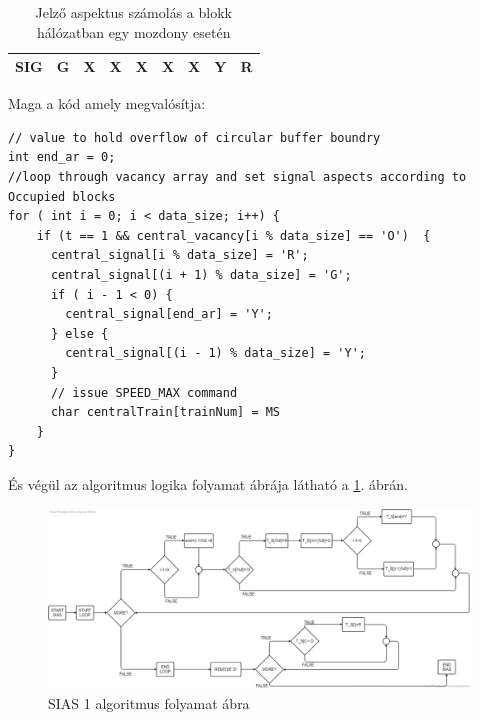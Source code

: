 \documentclass[a4paper,12pt]{article}
\begin{document}
\begin{table}[htp]
\begin{tabular}{lllllllll}
\multicolumn{1}{|l|}{SIG}   & \multicolumn{1}{l|}{\cellcolor[HTML]{009901}G} & \multicolumn{1}{l|}{X}                         & \multicolumn{1}{l|}{X}                         & \multicolumn{1}{l|}{X}                         & \multicolumn{1}{l|}{X}                         & \multicolumn{1}{l|}{X}                         & \multicolumn{1}{l|}{\cellcolor[HTML]{F8FF00}Y}                        & \multicolumn{1}{l|}{\cellcolor[HTML]{FE0000}R}                        \\ \hline
\end{tabular}
\caption[SIAS 1 mozdonnyal]{Jelző aspektus számolás a blokk hálózatban egy mozdony esetén}
\label{tab:sias_onetrain}
\end{table}

Maga a kód amely megvalósítja:

\begin{minipage}{\linewidth}
\begin{lstlisting}[style=CStyle, caption={SIAS algoritmus, egy vonat esettén az ACC-ben},label=code:acc_sias_1]
// value to hold overflow of circular buffer boundry
int end_ar = 0;
//loop through vacancy array and set signal aspects according to Occupied blocks
for ( int i = 0; i < data_size; i++) {
	if (t == 1 && central_vacancy[i % data_size] == 'O')  {
      central_signal[i % data_size] = 'R';
      central_signal[(i + 1) % data_size] = 'G';
      if ( i - 1 < 0) {
        central_signal[end_ar] = 'Y';
      } else {
        central_signal[(i - 1) % data_size] = 'Y';
      }
      // issue SPEED_MAX command
	  char centralTrain[trainNum] = MS
    }
}
\end{lstlisting}
\end{minipage}
És végül az algoritmus logika folyamat ábrája látható a \ref{fig:SIAS1flowchart}. ábrán.

\begin{figure}[!htp]
	\includegraphics[width=\linewidth]{images/SIAS1_module_flow_chart.png}
    \caption[SIAS 1 folyamat ábra]{SIAS 1 algoritmus folyamat ábra}
	\label{fig:SIAS1flowchart}
\end{figure}
\end{document}
